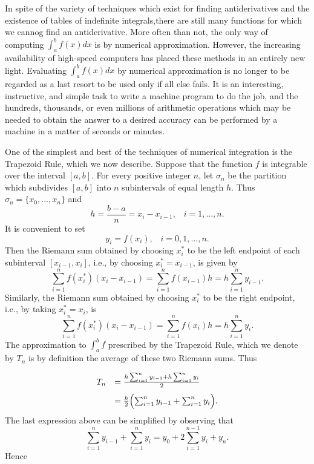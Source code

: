 In spite of the variety of techniques which exist for finding antiderivatives and the existence of tables of indefinite integrals,there are still many functions for which we cannog find an antiderivative. More often than not, the only way of computing $\int_a^b f(x) dx$ is by numerical approximation. However, the increasing availability of high-speed computers has placed these methods in an entirely new light. Evaluating $\int_a^b f (x) dx$ by numerical approximation is no longer to be regarded as a last resort to be used only if all else fails. It is an interesting, instructive, and simple task to write a machine program to do the job, and the hundreds, thousands, or even millions of arithmetic operations which may be needed to obtain the answer to a desired accuracy can be performed by a machine in a matter of seconds or minutes.

One of the simplest and best of the techniques of numerical integration is the Trapezoid Rule, which we now describe. Suppose that the function $f$ is integrable over the interval $[a, b]$. For every positive integer $n$, let $\sigma_n$ be the partition which subdivides $[a, b]$ into $n$ subintervals of equal length $h$. Thus $\sigma_n = \{ x_0, . . ., x_n \}$ and
$$
h = \frac{b - a}{n} = x_i - x_{i-1}, \;\;\; i = 1, ... , n.
$$
\noindent It is convenient to set
$$
y_i = f(x_i), \;\;\; i = 0, 1, ... , n.
$$
\noindent Then the Riemann sum obtained by choosing $x_i^*$ to be the left endpoint of each subinterval $[x_{i-1}, x_i]$, i.e., by choosing $x_{i}^{*} = x_{i-1}$, is given by
$$
\sum_{i=1}^{n} f (x_{i}^{*})(x_i - x_{i-1}) = \sum_{i=1}^{n} f (x_{i-1})h = h \sum_{i=1}^{n} y_{i-1} .  
$$
\noindent Similarly, the Riemann sum obtained by choosing $x_{i}^{*}$ to be the right endpoint, i.e., by taking $x_{i}^{*} = x_i$, is
$$
\sum_{i=1}^{n} f(x_{i}^{*})(x_i - x_{i-1}) = \sum_{i=1}^{n}  f(x_i) h = h \sum_{i=1}^{n} y_i .
$$
\noindent The approximation to $\int_a^b f$ prescribed by the Trapezoid Rule, which we denote by $T_n$ is by definition the average of these two Riemann sums. Thus

\begin{equation}
\begin{array}{ll}
T_n &= \frac{h \sum_{i=1}^{n} y_{i-1} + h \sum_{i=1}^{n} y_i}{2} \vspace{.1in}\\
       &= \frac{h}{2} \Bigl( \sum_{i=1}^{n} y_{i - 1} + \sum_{i=1}^{n} y_i \Bigr) .
\end{array}
\label{eq8.2.1}
\end{equation}
\noindent The last expression above can be simplified by observing that
$$
\sum_{i=1}^{n} y_{i - 1} + \sum_{i=1}^{n} y_i = y_0 + 2\sum_{i=1}^{n-1} y_i + y_n .
$$ 
\noindent Hence

